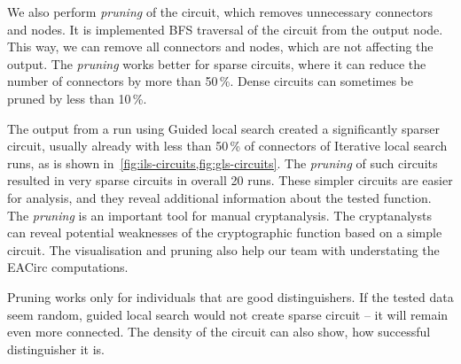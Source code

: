 \documentclass[
  print, %
  Table,   %
  nolof,     %
  nolot,     %
  11pt, %
  oneside  %
]{fithesis3}
\begin{document}
We also perform \textit{pruning} of the circuit, which removes unnecessary connectors and nodes. It is implemented BFS traversal of the circuit from the output node. This way, we can remove all connectors and nodes, which are not affecting the output. The \textit{pruning} works better for sparse circuits, where it can reduce the number of connectors by more than 50\,\%. Dense circuits can sometimes be pruned by less than 10\,\%.

The output from a run using Guided local search created a significantly sparser circuit, usually already with less than 50\,\% of connectors of Iterative local search runs, as is shown in~\cref{fig:ils-circuits,fig:gls-circuits}. The \textit{pruning} of such circuits resulted in very sparse circuits in overall 20 runs. These simpler circuits are easier for analysis, and they reveal additional information about the tested function. The \textit{pruning} is an important tool for manual cryptanalysis. The cryptanalysts can reveal potential weaknesses of the cryptographic function based on a simple circuit. The visualisation and pruning also help our team with understating the EACirc computations.

Pruning works only for individuals that are good distinguishers. If the tested data seem random, guided local search would not create sparse circuit -- it will remain even more connected. The density of the circuit can also show, how successful distinguisher it is.
\end{document}
